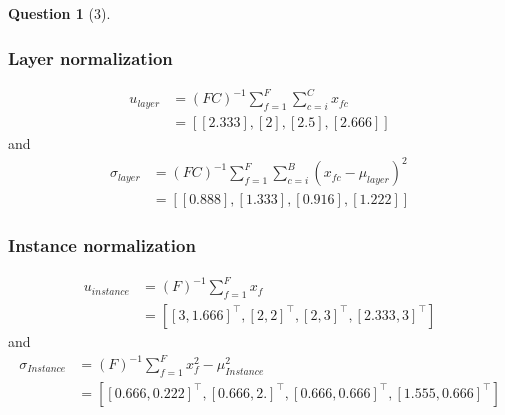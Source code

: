 \documentclass[12pt]{article}
\theoremstyle{definition}
\newtheorem{exercise}{Question}%
\begin{document}
\begin{exercise}[3]
{    \subsubsection*{Layer normalization}
      \begin{align*}
        u_{layer} &= (FC)^{-1} \sum_{f = 1}^{F}  \sum_{c= i}^{C} x_{fc}\\
        &= [[2.333], [ 2 ], [2.5], [2.666]]
      \end{align*} and
      \begin{align*}
        \sigma_{layer} &= (FC)^{-1} \sum_{f = 1}^{F}  \sum_{c= i}^{B}(x_{fc} -\mu_{layer})^{2}\\
        &= [[0.888], [1.333], [0.916], [1.222]]
      \end{align*}
    \subsubsection*{Instance normalization}
      \begin{align*}
        u_{instance} &= (F)^{-1} \sum_{f = 1}^{F}  x_{f}\\
        &= [[3        , 1.666]^{\top},
       [2        , 2        ]^{\top},
       [2        , 3        ]^{\top},
       [2.333, 3        ]^{\top}]
      \end{align*} and
      \begin{align*}
        \sigma_{Instance} &= (F)^{-1} \sum_{f = 1}^{F}  x_{f}^{2} -\mu_{Instance}^{2}\\
        &= [[0.666, 0.222]^{\top},
       [0.666, 2.        ]^{\top},
       [0.666, 0.666]^{\top},
          [1.555, 0.666]^{\top}]
      \end{align*}
    }
\end{exercise}
\end{document}
